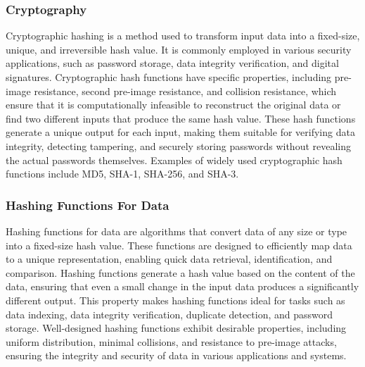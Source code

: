 \subsubsection{Cryptography}

Cryptographic hashing is a method used to transform input data into a fixed-size, unique, and irreversible hash value. It is commonly employed in various security applications, such as password storage, data integrity 
verification, and digital signatures. Cryptographic hash functions have specific properties, including pre-image resistance, second pre-image resistance, and collision resistance, which ensure that it is computationally 
infeasible to reconstruct the original data or find two different inputs that produce the same hash value. These hash functions generate a unique output for each input, making them suitable for verifying data integrity, 
detecting tampering, and securely storing passwords without revealing the actual passwords themselves. Examples of widely used cryptographic hash functions include MD5, SHA-1, SHA-256, and SHA-3.

\subsubsection{Hashing Functions For Data}

Hashing functions for data are algorithms that convert data of any size or type into a fixed-size hash value. These functions are designed to efficiently map data to a unique representation, enabling quick data retrieval, 
identification, and comparison. Hashing functions generate a hash value based on the content of the data, ensuring that even a small change in the input data produces a significantly different output. This property makes 
hashing functions ideal for tasks such as data indexing, data integrity verification, duplicate detection, and password storage. Well-designed hashing functions exhibit desirable properties, including uniform distribution, 
minimal collisions, and resistance to pre-image attacks, ensuring the integrity and security of data in various applications and systems.